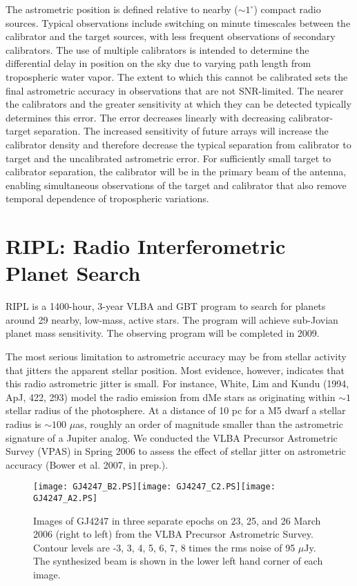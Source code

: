 \documentclass[12pt,preprint]{aastex}
\begin{document}
The astrometric position is defined relative to nearby ($\sim 1^\circ$)
compact radio sources.  Typical observations include switching on
minute timescales between the calibrator and the target sources,
with less frequent observations of secondary calibrators.
The use of multiple calibrators is intended to determine the differential
delay in position on the sky due to varying path length from tropospheric
water vapor.  The extent to which this cannot be calibrated sets the 
final astrometric accuracy in observations that are not SNR-limited.  
The nearer the
calibrators and the greater sensitivity at which they can be detected typically
determines this error.  The error decreases linearly with decreasing 
calibrator-target separation.  The increased sensitivity of future arrays will 
increase the calibrator density and therefore decrease the typical separation
from calibrator to target and the uncalibrated astrometric error.
For sufficiently small target to calibrator separation, the calibrator will
be in the primary beam of the antenna, enabling simultaneous
observations of the target and calibrator that also remove temporal dependence
of tropospheric variations.

\section{RIPL:  Radio Interferometric Planet Search}

RIPL is a 1400-hour, 3-year VLBA and GBT program to search
for planets around 29 nearby, low-mass, active stars.  The program will 
achieve sub-Jovian planet mass sensitivity.  The observing program will 
be completed in 2009.

The most serious limitation to astrometric accuracy may be from
stellar activity that jitters the apparent stellar position.  Most
evidence, however, indicates that this radio astrometric 
jitter is small.  For instance,
White, Lim and Kundu (1994, ApJ, 422, 293) 
model the radio emission from dMe stars as originating
within $\sim 1$ stellar radius of the photosphere.  At a distance of
10 pc for a M5 dwarf a stellar radius is $\sim 100$ $\mu$as, roughly
an order of magnitude smaller than the astrometric signature of a
Jupiter analog.  We conducted the VLBA Precursor Astrometric Survey
(VPAS) in Spring 2006 to assess the effect of stellar jitter on
astrometric accuracy (Bower et al.  2007, in prep.).


\begin{figure}[tb]
\center\mbox{\texttt{[image: GJ4247\_B2.PS]}\texttt{[image: GJ4247\_C2.PS]}\texttt{[image: GJ4247\_A2.PS]}}
\caption[]{Images of GJ4247 in three separate epochs on 23, 25, and 
26 March 2006 (right to left) from the VLBA Precursor Astrometric Survey.  
Contour levels are -3, 3, 4, 5, 6, 7, 8 times the rms noise of 95 $\mu$Jy.  
The synthesized beam is shown in the lower left hand corner of each image.
\label{fig:motion}}
\end{figure}
\end{document}
